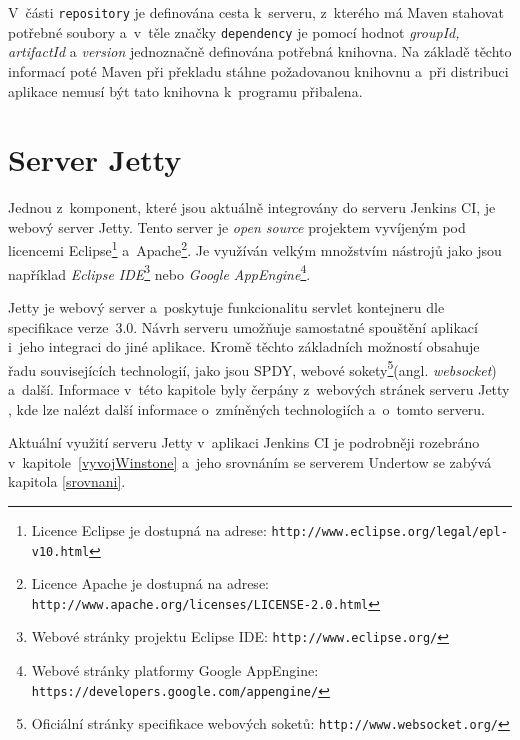         V~části \texttt{repository} je definována cesta k~serveru, z~kterého má Maven stahovat potřebné soubory
        a~v~těle značky \texttt{dependency} je pomocí hodnot \emph{groupId, artifactId} a \emph{version} jednoznačně
        definována potřebná knihovna. Na základě těchto informací poté Maven při překladu stáhne požadovanou
        knihovnu a~při distribuci aplikace nemusí být tato knihovna k~programu přibalena. 


    \section{Server Jetty} \label{jetty}
        Jednou z~komponent, které jsou aktuálně integrovány do serveru Jenkins CI, je webový server Jetty.
        Tento server je \emph{open source} projektem vyvíjeným pod licencemi 
        Eclipse\footnote{Licence Eclipse je dostupná na adrese: \texttt{http://www.eclipse.org/legal/epl-v10.html}}
        a~Apache\footnote{Licence Apache je dostupná 
        na adrese: \texttt{http://www.apache.org/licenses/LICENSE-2.0.html}}. 
            Je využíván velkým množstvím nástrojů jako jsou například \emph{Eclipse IDE}\footnote{Webové stránky projektu Eclipse IDE:
        \texttt{http://www.eclipse.org/}} nebo \emph{Google AppEngine}\footnote{Webové stránky platformy Google AppEngine:
        \texttt{https://developers.google.com/appengine/}}.

        Jetty je webový server a~poskytuje funkcionalitu servlet kontejneru dle specifikace verze~3.0. 
        Návrh serveru umožňuje samostatné spouštění aplikací i~jeho integraci do jiné aplikace. 
        Kromě těchto základních možností obsahuje
        řadu souvisejících technologií, jako jsou SPDY, webové sokety\footnote{Oficiální stránky 
            specifikace webových soketů: \texttt{http://www.websocket.org/}}(angl. \emph{websocket}) a~další. 
        Informace v~této kapitole byly čerpány z~webových stránek serveru Jetty \cite{jettyWeb}, kde lze nalézt 
        další informace o~zmíněných technologiích a~o~tomto serveru.
        
        Aktuální využití serveru Jetty v~aplikaci Jenkins CI je podrobněji rozebráno
        v~kapitole~\ref{vyvojWinstone} a~jeho srovnáním se serverem Undertow se 
        zabývá kapitola \ref{srovnani}.
        

